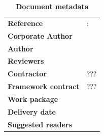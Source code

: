 \clearpage


\setlength{\headheight}{1cm}
\setlength{\footskip}{18mm}
\addtolength{\textheight}{-\footskip}
\pagestyle{empty}

\clearpage

\vspace*{\fill}

\textbf{\footnotesize \DelPreparation}

\begin{flushleft}
	\begin{table}[!b]
		\caption*{\large\textbf{Document metadata}}
		\footnotesize
		\begin{tabular}{p{3.6cm}p{\textwidth-5cm}}
			\textbf{Reference}          & \DelNumber: \DelTitle \\
			\textbf{Corporate Author}   & \DelCorporateAuthor   \\
			\textbf{Author}             & \DelAuthor            \\
			\textbf{Reviewers}          & \DelReviewer          \\
			\textbf{Contractor}         & ???        \\
			\textbf{Framework contract} & ???           \\
			\textbf{Work package}       & \DelNumber            \\
			\textbf{Delivery date}      & \DelDate              \\
			\textbf{Suggested readers}  & \DelReaders           \\
		\end{tabular}
	\end{table}
\end{flushleft}


\clearpage

\clearpage


\pagestyle{fancy}
\fancyhf{}
\fancyhead[RE]{\slshape\nouppercase{\rightmark}}      %
\fancyhead[LO]{\slshape\nouppercase{\leftmark}}     %
\cfoot{\thepage}

